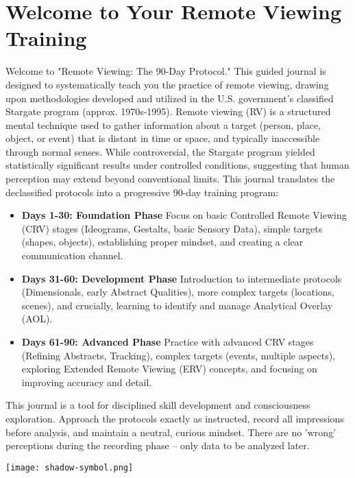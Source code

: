 \documentclass[10pt,twoside,final]{book} %
\makeatletter
\newcommand{\cleardoublepageWithSymbol}{%
  \clearpage %
  \if@twoside %
    \ifodd\c@page %
    \else %
      \thispagestyle{fancy} %
      \begingroup %
        \vspace*{0pt} %
        \vfill %
        \centering %
        \noindent 
        \texttt{[image: shadow-symbol.png]}
        \vfill %
      \endgroup
      \newpage    %
      \if@twocolumn\if@firstcolumn\else\hbox{}\newpage\fi\fi
    \fi
  \fi
}
\makeatother
\begin{document}
\chapter*{Welcome to Your Remote Viewing Training}
\thispagestyle{empty}
\begin{mdframed}[backgroundcolor=white, linecolor=rvprimary, linewidth=0.7pt, shadow=true, shadowsize=1pt, shadowcolor=graydark!40, roundcorner=3pt, innertopmargin=12pt, innerbottommargin=12pt]
Welcome to "Remote Viewing: The 90-Day Protocol." This guided journal is designed to systematically teach you the practice of remote viewing, drawing upon methodologies developed and utilized in the U.S. government's classified Stargate program (approx. 1970s-1995).
Remote viewing (RV) is a structured mental technique used to gather information about a target (person, place, object, or event) that is distant in time or space, and typically inaccessible through normal senses. While controversial, the Stargate program yielded statistically significant results under controlled conditions, suggesting that human perception may extend beyond conventional limits.
This journal translates the declassified protocols into a progressive 90-day training program:
\begin{itemize}
    \item \textbf{Days 1-30: Foundation Phase} \newline Focus on basic Controlled Remote Viewing (CRV) stages (Ideograms, Gestalts, basic Sensory Data), simple targets (shapes, objects), establishing proper mindset, and creating a clear communication channel.
    \item \textbf{Days 31-60: Development Phase} \newline Introduction to intermediate protocols (Dimensionals, early Abstract Qualities), more complex targets (locations, scenes), and crucially, learning to identify and manage Analytical Overlay (AOL).
    \item \textbf{Days 61-90: Advanced Phase} \newline Practice with advanced CRV stages (Refining Abstracts, Tracking), complex targets (events, multiple aspects), exploring Extended Remote Viewing (ERV) concepts, and focusing on improving accuracy and detail.
\end{itemize}
This journal is a tool for disciplined skill development and consciousness exploration. Approach the protocols exactly as instructed, record all impressions before analysis, and maintain a neutral, curious mindset. There are no 'wrong' perceptions during the recording phase – only data to be analyzed later.
\end{mdframed}
\cleardoublepageWithSymbol
\end{document}
